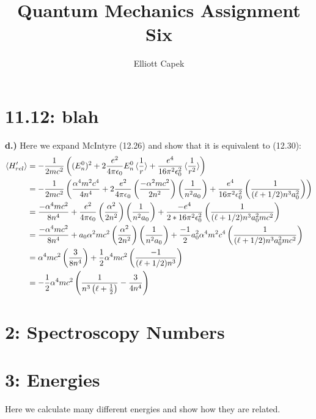 \documentclass[10pt]{article} %
\title{Quantum Mechanics Assignment Six}
\author{Elliott Capek}
\begin{document}
\maketitle{}

\section{11.12: blah}

\textbf{d.)}
Here we expand McIntyre (12.26) and show that it is equivalent to (12.30):\\

\begin{align*}
  \braket{H'_{rel}} &=
  -\frac{1}{2mc^2}\left((E_n^0)^2 +
  2\frac{e^2}{4\pi\epsilon_0}E_n^0\braket{\frac{1}{r}} +
  \frac{e^4}{16\pi^2\epsilon_0^2}\braket{\frac{1}{r^2}}\right)\\
  &= -\frac{1}{2mc^2}\left(\frac{\alpha^4m^2c^4}{4n^4}
  + 2\frac{e^2}{4\pi\epsilon_0}\left(\frac{-\alpha^2mc^2}{2n^2}\right)
  \left(\frac{1}{n^2a_0}\right) +
  \frac{e^4}{16\pi^2\epsilon_0^2}\left(\frac{1}{(\ell+1/2)n^3a_0^2}\right)\right)\\
  &= \frac{-\alpha^4mc^2}{8n^4}
  + \frac{e^2}{4\pi\epsilon_0}\left(\frac{\alpha^2}{2n^2}\right)
  \left(\frac{1}{n^2a_0}\right) +
  \frac{-e^4}{2*16\pi^2\epsilon_0^2}\left(\frac{1}{(\ell+1/2)n^3a_0^2mc^2}\right)\\
  &= \frac{-\alpha^4mc^2}{8n^4}
  + a_0\alpha^2mc^2\left(\frac{\alpha^2}{2n^2}\right)
  \left(\frac{1}{n^2a_0}\right) +
  \frac{-1}{2}a_0^2\alpha^4m^2c^4\left(\frac{1}{(\ell+1/2)n^3a_0^2mc^2}\right)\\
  &= \alpha^4mc^2\left(\frac{3}{8n^4}\right) +
  \frac{1}{2}\alpha^4mc^2\left(\frac{-1}{(\ell+1/2)n^3}\right)\\
  &= -\frac{1}{2}\alpha^4mc^2\left(\frac{1}{n^3\left(\ell+\frac{1}{2}\right)} -
    \frac{3}{4n^4}\right)\\
\end{align*}

\section{2: Spectroscopy Numbers}

\section{3: Energies}
Here we calculate many different energies and show how they are related.\\
\end{document}
